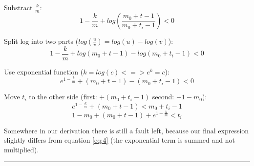 \begin{enumerate}
	Substract $\frac{k}{m}$:
	\begin{equation*}
		1 - \frac{k}{m} + log(\frac{m_0 + t - 1}{m_0 + t_i - 1}) < 0
	\end{equation*}
	
	Split log into two parts ($log(\frac{u}{v}) = log(u) - log(v)$):
	\begin{equation*}
		1 - \frac{k}{m} + log(m_0 + t - 1) - log(m_0 + t_i - 1) < 0
	\end{equation*}
	
	Use exponential function ($k=log(c) <=> e^k=c$):
	\begin{equation*}
		e^{1 - \frac{k}{m}} + (m_0 + t - 1) - (m_0 + t_i - 1) < 0
	\end{equation*}
	
	Move $t_i$ to the other side (first: $+ (m_0 + t_i - 1)$ second: $+1 - m_0$):
	\begin{equation*}
		e^{1 - \frac{k}{m}} + (m_0 + t - 1) < m_0 + t_i - 1
	\end{equation*}
	\begin{equation*}
	1 - m_0 + (m_0 + t - 1) + e^{1 - \frac{k}{m}} < t_i
	\end{equation*}
	
	Somewhere in our derivation there is still a fault left, because our final expression slightly differs from equation \ref{eq:4} (the exponential term is summed and not multiplied).
	
	\hrule \relax

\end{enumerate}